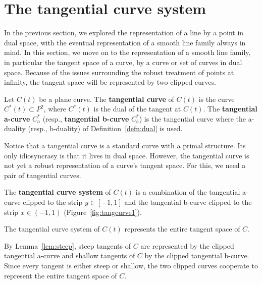 \documentclass[12pt]{article}
\begin{document}

\section{The tangential curve system}
\label{sec:tangcurve}

In the previous section, we explored the representation of a line
by a point in dual space, with the eventual representation of a smooth line family
always in mind.
In this section, we move on to the representation of a smooth line family,
in particular the tangent space of a curve, by a curve or set of curves in dual space.
Because of the issues surrounding the robust treatment of points at infinity,
the tangent space will be represented by two clipped curves.

\begin{defn2}
\label{defn:tangentialcurve}
Let $C(t)$ be a plane curve.
The {\bf tangential curve} of $C(t)$ is the curve $C^*(t) \subset P^2$,
where $C^*(t)$ is the dual of the tangent at $C(t)$.
The {\bf tangential a-curve} $C^*_a$ (resp., {\bf tangential b-curve} $C^*_b$)
is the tangential curve where the a-duality (resp., b-duality) of 
Definition~\ref{defn:dual} is used.
\end{defn2}

Notice that a tangential curve is a standard curve with a primal
structure.
Its only idiosyncrasy is that it lives in dual space.
However, the tangential curve is not yet a robust representation
of a curve's tangent space.
For this, we need a pair of tangential curves.

\begin{defn2}
\label{defn:tangentialsystem}
The {\bf tangential curve system} of $C(t)$ is a combination of
the tangential a-curve clipped to the strip $y \in [-1,1]$ and 
the tangential b-curve clipped to the strip $x \in (-1,1)$
(Figure~\ref{fig:tangcurve1}).
\end{defn2}

\begin{lemma}
The tangential curve system of $C(t)$ represents the entire tangent space of $C$.
\end{lemma}
\prf
By Lemma~\ref{lem:steep}, 
steep tangents of $C$ are represented by the clipped tangential a-curve and
shallow tangents of $C$ by the clipped tangential b-curve.
Since every tangent is either steep or shallow, the two clipped curves
cooperate to represent the entire tangent space of $C$.
\QED
\end{document}
